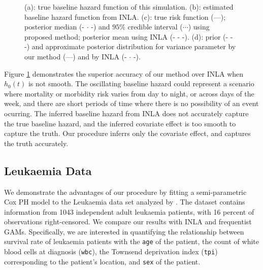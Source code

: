 \documentclass[]{article}
\begin{document}
\begin{figure}[ht]
{}
\caption{(a): true baseline hazard function of this simulation. (b): estimated baseline hazard function from INLA. (c): true risk function (---); posterior median (- $\cdot$ -) and $95\%$ credible interval ($\cdots$) using proposed method; posterior mean using INLA (- - -). (d): prior (- - -) and approximate posterior distribution for variance parameter by our method (---) and by INLA (- $\cdot$ -).}
\label{fig:simulation}
\end{figure}

Figure \ref{fig:simulation} demonstrates the superior accuracy of our method over INLA when $h_{0}(t)$ is not smooth. The oscillating baseline hazard could represent a scenario where mortality or morbidity risk varies from day to night, or across days of the week, and there are short periods of time where there is no possibility of an event ocurring. The inferred baseline hazard from INLA does not accurately capture the true baseline hazard, and the inferred covariate effect is too smooth to capture the truth. Our procedure inferrs only the covariate effect, and captures the truth accurately.

\subsection{Leukaemia Data}

We demonstrate the advantages of our procedure by fitting a semi-parametric Cox PH model to the Leukaemia data set analyzed by \citet{inlacoxph}. The dataset contains information from 1043 independent adult leukaemia patients, with 16 percent of observations right-censored. We compare our results with INLA and frequentist GAMs. Specifically, we are interested in quantifying the relationship between survival rate of leukaemia patients with the \texttt{age} of the patient, the count of white blood cells at diagnosis (\texttt{wbc}), the Townsend deprivation index (\texttt{tpi}) corresponding to the patient's location, and \texttt{sex} of the patient.
\end{document}
